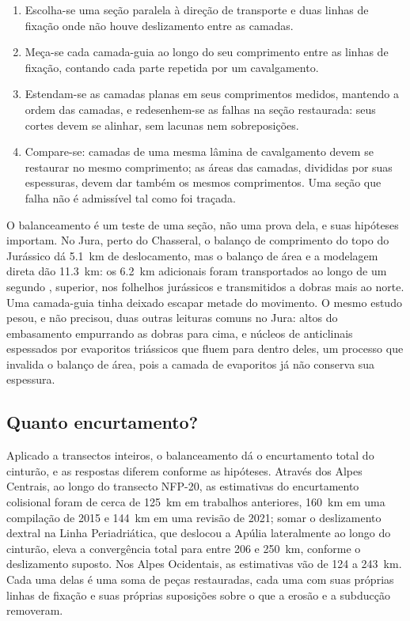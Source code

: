\begin{method}\label{met:b2:alpine-orogen:restore}
\begin{enumerate}
\item Escolha-se uma seção paralela à direção de transporte e duas linhas de fixação onde não
houve deslizamento entre as camadas.
\item Meça-se cada camada-guia ao longo do seu comprimento entre as linhas de fixação, contando cada parte
repetida por um cavalgamento.
\item Estendam-se as camadas planas em seus comprimentos medidos, mantendo a ordem das camadas,
e redesenhem-se as falhas na seção restaurada: seus cortes devem se alinhar, sem lacunas
nem sobreposições.
\item Compare-se: camadas de uma mesma lâmina de cavalgamento devem se restaurar no mesmo comprimento; as áreas das
camadas, divididas por suas espessuras, devem dar também os mesmos comprimentos. Uma seção que
falha não é admissível tal como foi traçada.
\end{enumerate}
\end{method}

O balanceamento é um teste de uma seção, não uma prova dela, e suas hipóteses importam. No Jura,
perto do Chasseral, o balanço de comprimento do topo do Jurássico dá \qty{5.1}{km} de
deslocamento, mas o balanço de área e a modelagem direta dão \qty{11.3}{km}: os
\qty{6.2}{km} adicionais foram transportados ao longo de um segundo , superior, nos folhelhos jurássicos e transmitidos
a dobras mais ao norte. Uma camada-guia tinha deixado escapar metade do movimento. O mesmo estudo
pesou, e não precisou, duas outras leituras comuns no Jura: altos do embasamento empurrando
as dobras para cima, e núcleos de anticlinais espessados por evaporitos triássicos que fluem para dentro deles, um
processo que invalida o balanço de área, pois a camada de evaporitos já não conserva sua
espessura.

\subsection*{Quanto encurtamento?}

Aplicado a transectos inteiros, o balanceamento dá o encurtamento total do cinturão, e as respostas
diferem conforme as hipóteses. Através dos Alpes Centrais, ao longo do transecto NFP-20, as estimativas
do encurtamento colisional foram de cerca de \qty{125}{km} em trabalhos anteriores, \qty{160}{km} em
uma compilação de 2015 e \qty{144}{km} em uma revisão de 2021; somar o deslizamento dextral na Linha Periadriática, que
deslocou a Apúlia lateralmente ao longo do cinturão, eleva a convergência total para entre 206 e
\qty{250}{km}, conforme o deslizamento suposto. Nos Alpes Ocidentais, as estimativas
vão de 124 a \qty{243}{km}. Cada uma delas é uma soma de peças restauradas, cada uma com
suas próprias linhas de fixação e suas próprias suposições sobre o que a erosão e a subducção removeram.

